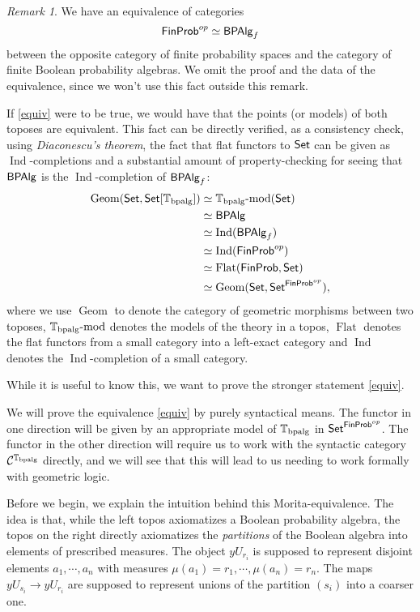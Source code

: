 \documentclass[a4paper]{amsproc}
\theoremstyle{plain}
\theoremstyle{definition}
\theoremstyle{remark}
\newtheorem{remark}[theorem]{Remark}
\numberwithin{equation}{section}
\newcommand{\y}{\textit{y}}
\DeclareMathOperator{\Geom}{Geom}
\DeclareMathOperator{\Ind}{Ind}
\DeclareMathOperator{\Flat}{Flat}
\newcommand{\Set}{\textup{\textsf{Set}}}
\newcommand{\FinProb}{\textup{\textsf{FinProb}}}
\newcommand{\BPAlg}{\textup{\textsf{BPAlg}}}
\begin{document}
\begin{remark}
    We have an equivalence of categories
    \[
        \FinProb^{op} \simeq \BPAlg_f
    \]
    between the opposite category of finite probability spaces and the category of finite Boolean probability algebras. We omit the proof and the data of the equivalence, since we won't use this fact outside this remark.

    If \ref{equiv} were to be true, we would have that the points (or models) of both toposes are equivalent. This fact can be directly verified, as a consistency check, using \emph{Diaconescu's theorem}, the fact that flat functors to $\Set$ can be given as $\Ind$-completions and a substantial amount of property-checking for seeing that $\BPAlg$ is the $\Ind$-completion of $\BPAlg_f$:
    \begin{align*}
        \Geom(\Set,\Set[\mathbb{T}_{\textup{bpalg}}]) &\simeq \mathbb{T}_{\textup{bpalg}}\textup{-mod}(\Set) \\
        &\simeq \BPAlg \\
        &\simeq \Ind(\BPAlg_f) \\
        &\simeq \Ind(\FinProb^{op}) \\
        &\simeq \Flat(\FinProb, \Set) \\
        &\simeq \Geom(\Set, \Set^{\FinProb^{op}}) ,
    \end{align*}
    where we use $\Geom$ to denote the category of geometric morphisms between two toposes, $\mathbb{T}_{\textup{bpalg}}\textup{-mod}$ denotes the models of the theory in a topos, $\Flat$ denotes the flat functors from a small category into a left-exact category and $\Ind$ denotes the $\Ind$-completion of a small category.

    While it is useful to know this, we want to prove the stronger statement \ref{equiv}.
\end{remark}

We will prove the equivalence \ref{equiv} by purely syntactical means. The functor in one direction will be given by an appropriate model of $\mathbb{T}_{\textup{bpalg}}$ in $\Set^{\FinProb^{op}}$. The functor in the other direction will require us to work with the syntactic category $\mathcal{C}^{\mathbb{T}_{\textup{bpalg}}}$ directly, and we will see that this will lead to us needing to work formally with geometric logic.

Before we begin, we explain the intuition behind this Morita-equivalence. The idea is that, while the left topos axiomatizes a Boolean probability algebra, the topos on the right directly axiomatizes the \emph{partitions} of the Boolean algebra into elements of prescribed measures. The object $\y U_{r_i}$ is supposed to represent disjoint elements $a_1,\cdots,a_n$ with measures $\mu(a_1) = r_1,\cdots,\mu(a_n) = r_n$. The maps $\y U_{s_i} \to \y U_{r_i}$ are supposed to represent unions of the partition $(s_i)$ into a coarser one.
\end{document}
